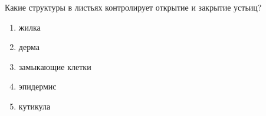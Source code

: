 
Какие структуры в
листьях контролирует открытие и закрытие устьиц?

\begin{enumerate}
    \item жилка
    \item дерма 
    \item замыкающие клетки 
    \item эпидермис
    \item кутикула
\end{enumerate}



